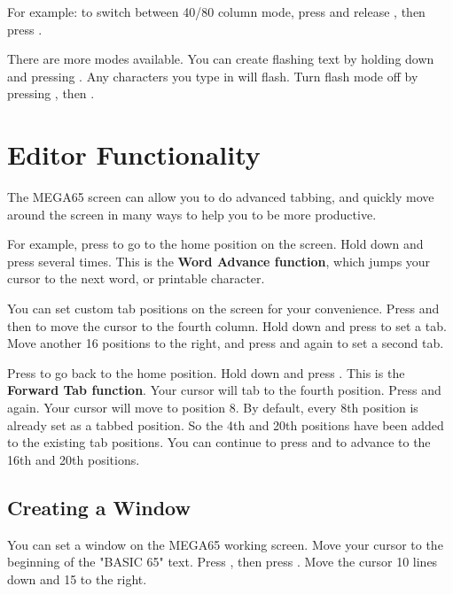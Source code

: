 For example: to switch between 40/80 column mode, press and release , then press .

There are more modes available. You can create flashing text by holding  down and pressing . Any characters you type in will flash. Turn flash mode off by pressing ,  then .


\section{Editor Functionality}

The MEGA65 screen can allow you to do advanced tabbing, and quickly move around the screen in many ways to help you to be more productive.

For example, press  to go to the home position on the screen. Hold  down and press  several times. This is the \textbf{Word Advance function}, which jumps your cursor to the next word, or printable character.

You can set custom tab positions on the screen for your convenience. Press  and then \megakey{$\rightarrow$} to move the cursor to the fourth column. Hold down  and press  to set a tab. Move another 16 positions to the right, and press  and  again to set a second tab.

Press  to go back to the home position. Hold  down and press . This is the \textbf{Forward Tab function}. Your cursor will tab to the fourth position. Press  and  again. Your cursor will move to position 8. By default, every 8th position is already set as a tabbed position. So the 4th and 20th positions have been added to the existing tab positions. You can continue to press  and  to advance to the 16th and 20th positions.

\subsection{Creating a Window}

You can set a window on the MEGA65 working screen. Move your cursor to the beginning of the "BASIC 65" text. Press , then press . Move the cursor 10 lines down and 15 to the right.

